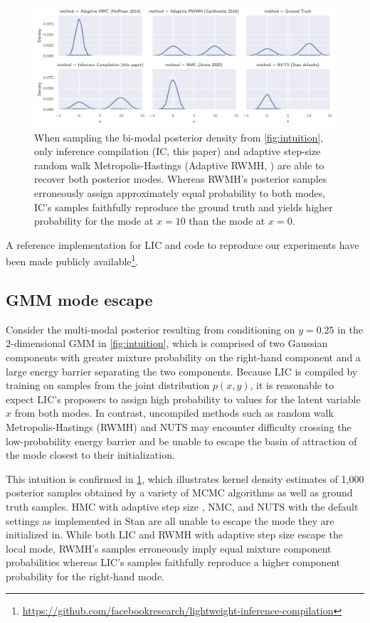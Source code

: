 \documentclass[../../thesis.tex]{subfiles}
\begin{document}
\begin{figure}
  \includegraphics[width=\linewidth]{Figures/mode_escape.pdf}
  \caption{
    When sampling the bi-modal posterior density from \cref{fig:intuition},
    only inference compilation (IC, this paper) and adaptive step-size random walk
    Metropolis-Hastings (Adaptive RWMH, \cite{garthwaite2016adaptive}) are
    able to recover both posterior modes. Whereas RWMH's posterior samples
    erroneously assign approximately equal probability to both modes,
    IC's samples faithfully reproduce the ground truth and yields
    higher probability for the mode at $x=10$ than the mode at $x=0$.
  }\label{fig:gmm_mode_escape}
\end{figure}

A reference implementation for LIC and code to reproduce our experiments
have been made publicly available\footnote{\url{https://github.com/facebookresearch/lightweight-inference-compilation}}.

\subsection{GMM mode escape}
\label{ssec:gmm}

Consider the multi-modal posterior resulting from conditioning on $y=0.25$ in
the 2-dimensional GMM in \cref{fig:intuition}, which is comprised of two
Gaussian components with greater mixture probability on the right-hand
component and a large energy barrier separating the two components. Because
LIC is compiled by training on samples from the joint distribution $p(x, y)$,
it is reasonable to expect LIC's proposers to assign high probability to
values for the latent variable $x$ from both modes. In contrast, uncompiled
methods such as random walk Metropolis-Hastings (RWMH) and NUTS may encounter
difficulty crossing the low-probability energy barrier and be unable to escape
the basin of attraction of the mode closest to their initialization.

This intuition is confirmed in \cref{fig:gmm_mode_escape}, which illustrates
kernel density estimates of 1,000 posterior samples obtained by a variety of
MCMC algorithms as well as ground truth samples. HMC with adaptive step size
\citep{hoffman2014no}, NMC, and NUTS with the default settings as implemented
in Stan \citep{carpenter2017stan} are all unable to escape the mode they are
initialized in. While both LIC and RWMH with adaptive step size escape the
local mode, RWMH's samples erroneously imply equal mixture component
probabilities whereas LIC's samples faithfully reproduce a higher component
probability for the right-hand mode.
\end{document}
